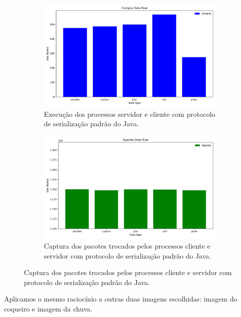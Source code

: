 \documentclass{article}
\begin{document}
\begin{figure}[H]
    \centering
    \caption{Captura de pacotes da serialização padrão no cenário de requisição de compra.}
    \begin{subfigure}[b]{0.7\textwidth}
        \includegraphics[width=\textwidth]{imgs/compra_data_size.png}
        \caption{Execução dos processos servidor e cliente com protocolo de serialização padrão do Java.}
        \label{fig:clock_original}
    \end{subfigure}%

    \begin{subfigure}[b]{0.7\textwidth}
        \includegraphics[width=\textwidth]{imgs/agenda_data_size.png}
        \caption{Captura dos pacotes trocados pelos processos cliente e servidor com protocolo de serialização padrão do Java.}
        \label{fig:clock_300dpi}
    \end{subfigure}%
    \label{fig:clock_comparison}
\end{figure}

Aplicamos o mesmo raciocínio a outras duas imagens escolhidas: imagem do coqueiro e imagem da chuva.
\end{document}
